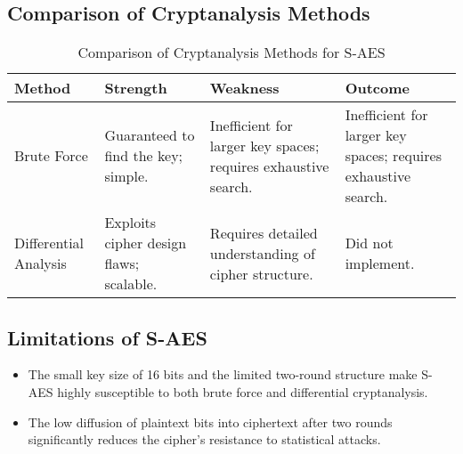 \documentclass{article}
\begin{document}
\newpage

\subsection{Comparison of Cryptanalysis Methods}
\begin{table}[h!]
    \begin{center}
        \begin{tabular}{|L|L|L|L|}
            \hline
            \textbf{Method} & \textbf{Strength} & \textbf{Weakness} & \textbf{Outcome}\\ 
            \hline
            Brute Force & Guaranteed to find the key; simple. & Inefficient for larger key spaces; requires exhaustive search. & Inefficient for larger key spaces; requires exhaustive search.\\ 
            \hline
            Differential Analysis & Exploits cipher design flaws; scalable. & Requires detailed understanding of cipher structure. & Did not implement.\\
            \hline
        \end{tabular}
        \caption{Comparison of Cryptanalysis Methods for S-AES}
        \label{table:cryptanalysis_comparison}  
    \end{center}
\end{table}

\subsection{Limitations of S-AES}
\begin{itemize}
    \item The small key size of 16 bits and the limited two-round structure make S-AES highly susceptible to both brute force and differential cryptanalysis.
    
    \item The low diffusion of plaintext bits into ciphertext after two rounds significantly reduces the cipher's resistance to statistical attacks.
\end{itemize}
\newpage

\end{document}
